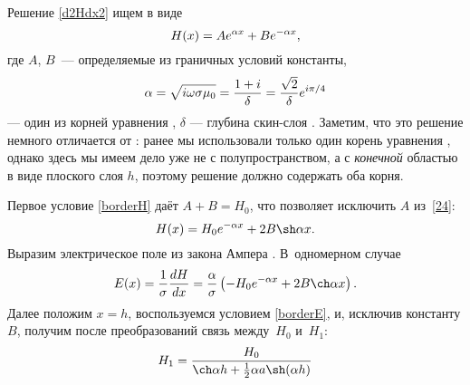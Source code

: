 Решение \eqref{d2Hdx2} ищем в виде
\begin{equation} \eqmark{24}
H(x)=A e^{\alpha x}+ B e^{-\alpha x},
\end{equation}
где $A$, $B$~--- определяемые из граничных условий константы,
\begin{equation}\eqmark{alpha}
\alpha=\sqrt{i\omega \sigma \mu_0}=\frac{1+i}{\delta} =
\frac{\sqrt{2}}{\delta} e^{i\pi/4}
\end{equation} --- один из корней уравнения ,
$\delta$ --- глубина скин-слоя .
Заметим, что это решение немного отличается от : ранее мы использовали только
один корень уравнения , однако здесь мы имеем дело уже не с
полупространством, а с \emph{конечной} областью в виде плоского слоя $h$,
поэтому решение должно содержать оба корня.

Первое условие \eqref{borderH} даёт $A+B = H_0$, что
позволяет исключить $A$ из~\eqref{24}:
\[
H(x) = H_0 e^{-\alpha x} + 2B \sh \alpha x.
\]
Выразим электрическое поле из закона Ампера .
В~одномерном случае
\[
E(x) = \frac{1}{\sigma} \frac{dH}{dx} =
\frac{\alpha}{\sigma}\left(-H_0 e^{-\alpha x}+ 2B \ch \alpha x\right).
\]
Далее положим $x=h$, воспользуемся условием \eqref{borderE},
и, исключив константу $B$, получим после преобразований связь
между~$H_0$ и~$H_1$:
\begin{equation}\eqmark{H0H1}
H_1 = \frac{H_0}{\ch \alpha h + \frac12 \alpha a \sh (\alpha h)}
\end{equation}

